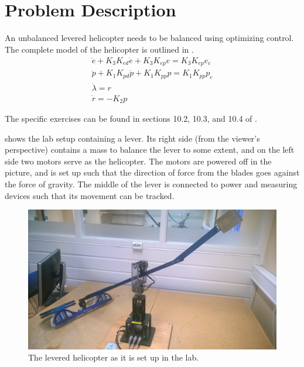 \section{Problem Description}\label{sec:prob_descr}
An unbalanced levered helicopter needs to be balanced using optimizing control.
The complete model of the helicopter is outlined in .
\begin{subequations}\label{eq:model}
	\begin{align}
		\ddot{e} + K_{3} K_{ed} \dot{e} + K_{3} K_{ep} e = K_{3} K_{ep} e_{c} \label{eq:model_se_elev} \\
		\ddot{p} + K_{1} K_{pd} \dot{p} + K_{1} K_{pp} p = K_{1} K_{pp} p_{c} \label{eq:model_se_pitch} \\
		\dot{\lambda} = r \label{eq:model_se_lambda} \\
		\dot{r} = -K_{2} p \label{eq:model_se_r}
	\end{align}
\end{subequations}

The specific exercises can be found in sections 10.2, 10.3, and 10.4 of .

 shows the lab setup containing a lever. Its right side (from the viewer's perspective) contains a mass to balance the lever to some extent, and on the left side two motors serve as the helicopter. The motors are powered off in the picture, and is set up such that the direction of force from the blades goes against the force of gravity. The middle of the lever is connected to power and measuring devices such that its movement can be tracked.

\begin{figure}[tp]
\centering
\includegraphics[width=1.00\textwidth]{figures/WP_20170426_003.jpg}
\caption{The levered helicopter as it is set up in the lab.}
\label{fig:layers_openloop}
\end{figure}
